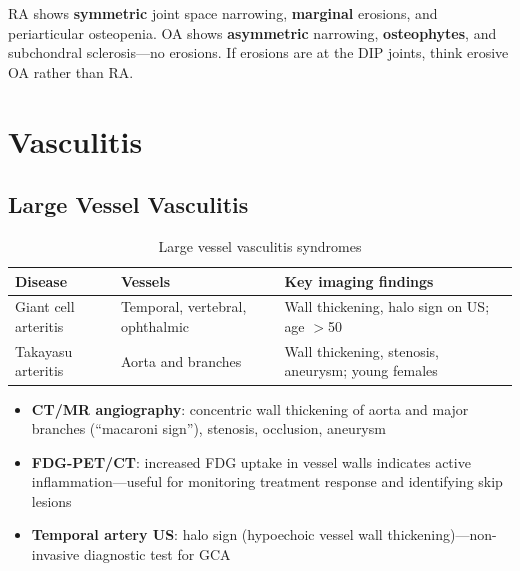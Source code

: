 \begin{pearlbox}
RA shows \textbf{symmetric} joint space narrowing, \textbf{marginal} erosions, and periarticular osteopenia. OA shows \textbf{asymmetric} narrowing, \textbf{osteophytes}, and subchondral sclerosis---no erosions. If erosions are at the DIP joints, think erosive OA rather than RA.
\end{pearlbox}

\section{Vasculitis}

\subsection{Large Vessel Vasculitis}
\begin{table}[h]
\centering
\caption{Large vessel vasculitis syndromes}
\begin{tabular}{|p{}|p{}|p{}|}
\hline
\textbf{Disease} & \textbf{Vessels} & \textbf{Key imaging findings} \\
\hline
Giant cell arteritis & Temporal, vertebral, ophthalmic & Wall thickening, halo sign on US; age $>$50 \\
Takayasu arteritis & Aorta and branches & Wall thickening, stenosis, aneurysm; young females \\
\hline
\end{tabular}
\end{table}

\begin{itemize}
  \item \textbf{CT/MR angiography}: concentric wall thickening of aorta and major branches (``macaroni sign''), stenosis, occlusion, aneurysm
  \item \textbf{FDG-PET/CT}: increased FDG uptake in vessel walls indicates active inflammation---useful for monitoring treatment response and identifying skip lesions
  \item \textbf{Temporal artery US}: halo sign (hypoechoic vessel wall thickening)---non-invasive diagnostic test for GCA
\end{itemize}

